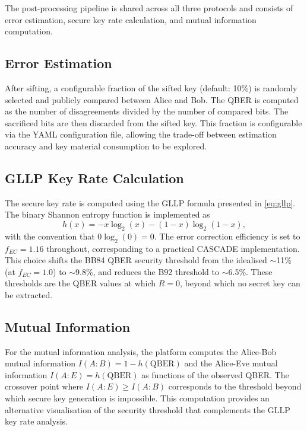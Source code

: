 The post-processing pipeline is shared across all three protocols and consists of error estimation, secure key rate calculation, and mutual information computation.

\subsection{Error Estimation}

After sifting, a configurable fraction of the sifted key (default: 10\%) is randomly selected and publicly compared between Alice and Bob. The QBER is computed as the number of disagreements divided by the number of compared bits. The sacrificed bits are then discarded from the sifted key. This fraction is configurable via the YAML configuration file, allowing the trade-off between estimation accuracy and key material consumption to be explored.

\subsection{GLLP Key Rate Calculation}

The secure key rate is computed using the GLLP formula presented in \cref{eq:gllp}. The binary Shannon entropy function is implemented as
%
\begin{equation}
\label{eq:binary-entropy}
h(x) = -x \log_2(x) - (1 - x) \log_2(1 - x),
\end{equation}
%
with the convention that $0 \log_2(0) = 0$. The error correction efficiency is set to $f_{EC} = 1.16$ throughout, corresponding to a practical CASCADE implementation. This choice shifts the BB84 QBER security threshold from the idealised $\sim$11\% (at $f_{EC} = 1.0$) to $\sim$9.8\%, and reduces the B92 threshold to $\sim$6.5\%. These thresholds are the QBER values at which $R = 0$, beyond which no secret key can be extracted.

\subsection{Mutual Information}

For the mutual information analysis, the platform computes the Alice-Bob mutual information $I(A{:}B) = 1 - h(\text{QBER})$ and the Alice-Eve mutual information $I(A{:}E) = h(\text{QBER})$ as functions of the observed QBER. The crossover point where $I(A{:}E) \geq I(A{:}B)$ corresponds to the threshold beyond which secure key generation is impossible. This computation provides an alternative visualisation of the security threshold that complements the GLLP key rate analysis.


